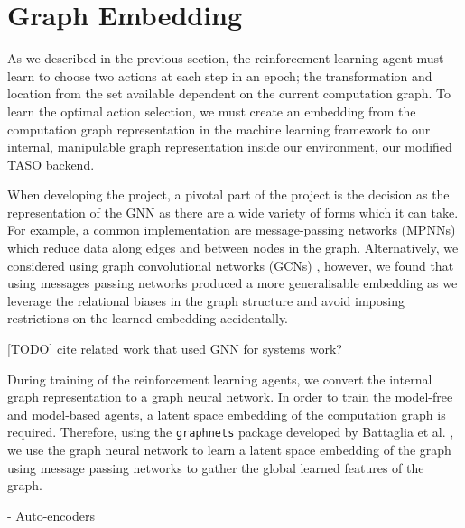 \section{Graph Embedding}
\label{sec:design:subsec:embed}
As we described in the previous section, the reinforcement learning agent must learn to choose two actions at each step in an epoch; the transformation and location from the set available dependent on the current computation graph. To learn the optimal action selection, we must create an embedding from the computation graph representation in the machine learning framework to our internal, manipulable graph representation inside our environment, our modified TASO backend.

When developing the project, a pivotal part of the project is the decision as the representation of the GNN as there are a wide variety of forms which it can take. For example, a common implementation are message-passing networks (MPNNs) \cite{gilmer2017neural} which reduce data along edges and between nodes in the graph. Alternatively, we considered using graph convolutional networks (GCNs) \cite{kipf2016semi}, however, we found that using messages passing networks produced a more generalisable embedding as we leverage the relational biases in the graph structure and avoid imposing restrictions on the learned embedding accidentally.

[TODO] cite related work that used GNN for systems work?

During training of the reinforcement learning agents, we convert the internal graph representation to a graph neural network. In order to train the model-free and model-based agents, a latent space embedding of the computation graph is required. Therefore, using the \texttt{graph\textunderscore nets} package developed by Battaglia et al. \cite{battaglia2018relational}, we use the graph neural network to learn a latent space embedding of the graph using message passing networks to gather the global learned features of the graph.

- Auto-encoders
